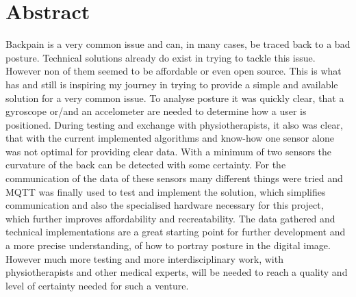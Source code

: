 \chapter*{Abstract}
\label{chap:Abstract}
\renewcommand{\thesection}{\arabic{section}}
\setcounter{section}{0}
Backpain is a very common issue and can, in many cases, be traced back to a bad posture. 
Technical solutions already do exist in trying to tackle this issue. However non of them seemed to be affordable or even open source. This is what has and still is inspiring my journey in trying to provide a simple and available solution for a very common issue. \newline
To analyse posture it was quickly clear, that a gyroscope or/and an accelometer are needed to determine how a user is positioned. During testing and exchange with physiotherapists, it also was clear, that with the current implemented algorithms and know-how one sensor alone was not optimal for providing clear data. With a minimum of two sensors the curvature of the back can be detected with some certainty. For the communication of the data of these sensors many different things were tried and MQTT was finally used to test and implement the solution, which simplifies communication and also the specialised hardware necessary for this project, which further improves affordability and recreatability. \newline
The data gathered and technical implementations are a great starting point for further development and a more precise understanding, of how to portray posture in the digital image. However much more testing and more interdisciplinary work, with physiotherapists and other medical experts, will be needed to reach a quality and level of certainty needed for such a venture.   